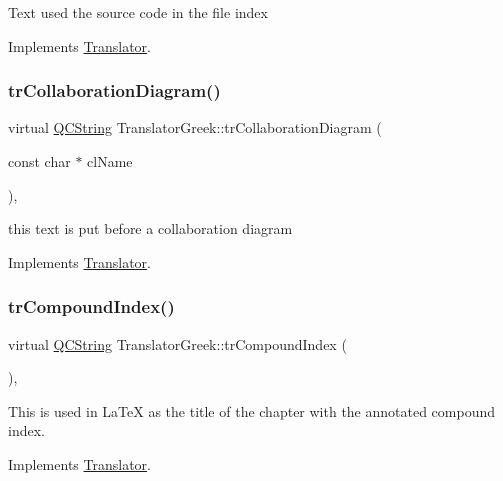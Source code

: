 Text used the source code in the file index 

Implements \mbox{\hyperlink{class_translator}{Translator}}.

\mbox{\label{class_translator_greek_a5f25400b841e578b8b335bd6f5626c17}} 
\subsubsection{\texorpdfstring{trCollaborationDiagram()}{trCollaborationDiagram()}}
{\footnotesize\ttfamily virtual \mbox{\hyperlink{class_q_c_string}{Q\+C\+String}} Translator\+Greek\+::tr\+Collaboration\+Diagram (\begin{DoxyParamCaption}\item[{const char $\ast$}]{cl\+Name }\end{DoxyParamCaption})\hspace{0.3cm}{\ttfamily [inline]}, {\ttfamily [virtual]}}

this text is put before a collaboration diagram 

Implements \mbox{\hyperlink{class_translator}{Translator}}.

\mbox{\label{class_translator_greek_aab861363a10aca53a2fb665ffe0787ed}} 
\subsubsection{\texorpdfstring{trCompoundIndex()}{trCompoundIndex()}}
{\footnotesize\ttfamily virtual \mbox{\hyperlink{class_q_c_string}{Q\+C\+String}} Translator\+Greek\+::tr\+Compound\+Index (\begin{DoxyParamCaption}{ }\end{DoxyParamCaption})\hspace{0.3cm}{\ttfamily [inline]}, {\ttfamily [virtual]}}

This is used in La\+TeX as the title of the chapter with the annotated compound index. 

Implements \mbox{\hyperlink{class_translator}{Translator}}.

\mbox{\label{class_translator_greek_a3768a65c59f253ca17881ce265f5b23e}} 
